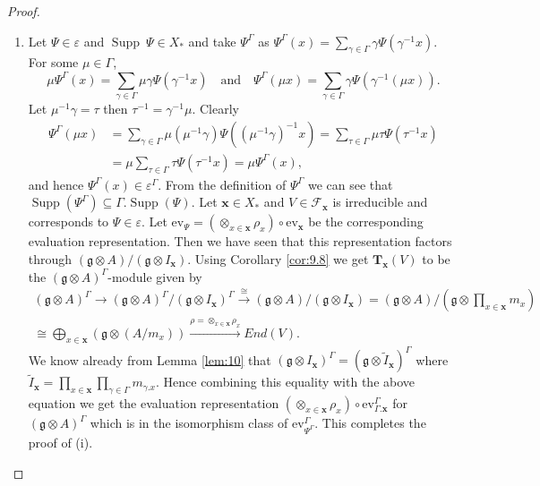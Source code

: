 \documentclass[11pt]{amsart}
\theoremstyle{plain}
\theoremstyle{definition}
\newcommand{\g}{\mathfrak{g}}
\DeclareMathOperator{\Supp}{Supp}
\begin{document}
\begin{proof}
\begin{enumerate}[label=(\alph*)]
    \item Let $\Psi\in\varepsilon$ and $\Supp\ \Psi\in X_{*}$ and take $\Psi^{\Gamma}$ as 
        $\Psi^{\Gamma}(x)=\sum_{\gamma\in\Gamma}\gamma\Psi(\gamma^{-1}x).$
    For some $\mu\in\Gamma$,
\begin{equation*}
        \mu\Psi^{\Gamma}(x)=\sum_{\gamma\in\Gamma}\mu\gamma\Psi(\gamma^{-1}x)
   \quad \mbox{and} \quad
\Psi^{\Gamma}(\mu x)=\sum_{\gamma\in\Gamma}\gamma \Psi(\gamma^{-1}(\mu x)).
    \end{equation*}
    Let $\mu^{-1}\gamma=\tau$ then $\tau^{-1}=\gamma^{-1}\mu$. Clearly
    \begin{align*}
         \Psi^{\Gamma}(\mu x)&=\sum_{\gamma\in\Gamma}\mu(\mu^{-1}\gamma)\Psi((\mu^{-1}\gamma)^{-1} x)=\sum_{\tau\in\Gamma}\mu\tau\Psi(\tau^{-1}x)\\
        &=\mu\sum_{\tau\in\Gamma}\tau\Psi(\tau^{-1}x)=\mu\Psi^{\Gamma}(x),
    \end{align*}
    and hence $\Psi^{\Gamma}(x)\in\varepsilon^{\Gamma}$. From the definition of $\Psi^{\Gamma}$ we can see that  $\Supp(\Psi^{\Gamma})\subseteq\Gamma.\Supp(\Psi)$. Let $\textbf{x}\in X_{*}$ and $V\in\mathcal{F}_{\textbf{x}}$ is irreducible and corresponds to $\Psi\in\varepsilon$. Let $\mbox{ev}_{\Psi}=(\otimes_{x\in\textbf{x}}\rho_x)\circ\mbox{ev}_{\textbf{x}}$ be the corresponding evaluation representation. Then we have seen that this representation factors through $(\g\otimes A)/(\g\otimes I_{\textbf{x}})$. Using Corollary \ref{cor:9.8} we get $\textbf{T}_{\textbf{x}}(V)$ to be the $(\g\otimes A)^{\Gamma}$-module given by
    \begin{equation}
    \begin{split}
        (\g\otimes A)^{\Gamma}\rightarrow(\g\otimes A)^{\Gamma}/(\g\otimes I_{\textbf{x}})^{\Gamma}\xrightarrow{\cong}(\g\otimes A)/(\g\otimes I_{\textbf{x}})=(\g\otimes A)/(\g\otimes \prod_{x\in\textbf{x}}m_{x})\\\cong\bigoplus_{x\in\textbf{x}}(\g\otimes(A/m_{x}))\xrightarrow{\rho=\otimes_{x\in\textbf{x}}\rho_{x}}End(V).
    \end{split}    
    \end{equation}
    We know already from Lemma \ref{lem:10} that $(\g\otimes I_{\textbf{x}})^{\Gamma}=(\g\otimes \tilde I_{\textbf{x}})^{\Gamma}$ where $\tilde I_{\textbf{x}}=\prod_{x\in\textbf{x}}\prod_{\gamma\in\Gamma}m_{\gamma.x}$. Hence combining this equality with the above equation we get the evaluation representation $(\otimes_{x\in\textbf{x}}\rho_{x})\circ\mbox{ev}^{\Gamma}_{\Gamma.\textbf{x}}$ for $(\g\otimes A)^{\Gamma}$ which is in the isomorphism class of $\mbox{ev}^{\Gamma}_{\Psi^{\Gamma}}$. This completes the proof of (i).

\end{enumerate}
\end{proof}
\end{document}
